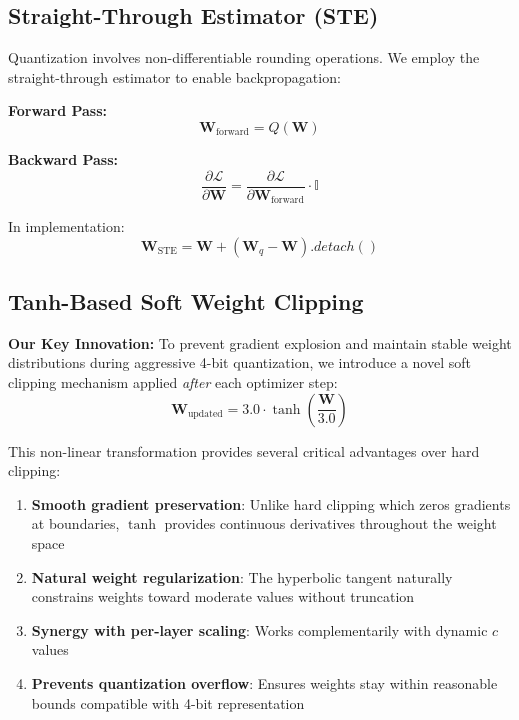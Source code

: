 \documentclass[conference]{IEEEtran}
\begin{document}
\subsection{Straight-Through Estimator (STE)}
Quantization involves non-differentiable rounding operations. We employ the straight-through estimator \cite{bengio2013estimating} to enable backpropagation:

\textbf{Forward Pass:}
\begin{equation}
\mathbf{W}_{\text{forward}} = Q(\mathbf{W})
\end{equation}

\textbf{Backward Pass:}
\begin{equation}
\frac{\partial \mathcal{L}}{\partial \mathbf{W}} = \frac{\partial \mathcal{L}}{\partial \mathbf{W}_{\text{forward}}} \cdot \mathbb{I}
\end{equation}

In implementation:
\begin{equation}
\mathbf{W}_{\text{STE}} = \mathbf{W} + (\mathbf{W}_q - \mathbf{W}).detach()
\end{equation}

\subsection{Tanh-Based Soft Weight Clipping}
\label{sec:tanh_clipping}
\textbf{Our Key Innovation:} To prevent gradient explosion and maintain stable weight distributions during aggressive 4-bit quantization, we introduce a novel soft clipping mechanism applied \textit{after} each optimizer step:
\begin{equation}
\mathbf{W}_{\text{updated}} = 3.0 \cdot \tanh\left(\frac{\mathbf{W}}{3.0}\right)
\label{eq:tanh_clip}
\end{equation}

This non-linear transformation provides several critical advantages over hard clipping:
\begin{enumerate}
    \item \textbf{Smooth gradient preservation}: Unlike hard clipping which zeros gradients at boundaries, $\tanh$ provides continuous derivatives throughout the weight space
    \item \textbf{Natural weight regularization}: The hyperbolic tangent naturally constrains weights toward moderate values without truncation
    \item \textbf{Synergy with per-layer scaling}: Works complementarily with dynamic $c$ values
    \item \textbf{Prevents quantization overflow}: Ensures weights stay within reasonable bounds compatible with 4-bit representation
\end{enumerate}
\end{document}
